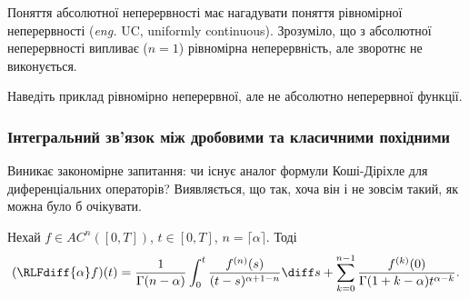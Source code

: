 \begin{remark}
    Поняття абсолютної неперервності має нагадувати поняття рівномірної неперервності (\textit{eng.} UC, uniformly continuous). Зрозуміло, що з абсолютної неперервності випливає ($n = 1$) рівномірна неперервність, але зворотнє не виконується.
\end{remark}

\begin{exercise}
    Наведіть приклад рівномірно неперервної, але не абсолютно неперервної функції.
\end{exercise}



\subsubsection{Інтегральний зв'язок між дробовими та класичними похідними}

Виникає закономірне запитання: чи існує аналог формули Коші-Діріхле для диференціальних операторів? Виявляється, що так, хоча він і не зовсім такий, як можна було б очікувати.

\begin{theorem}
    Нехай $f \in AC^n([0, T])$, $t \in [0, T]$, $n = \lceil \alpha \rceil$. Тоді
    \begin{equation}
        (\RLFdiff{\alpha} f) (t) = \frac{1}{\Gamma(n - \alpha)} \int_0^t \frac{f^{(n)}(s)}{(t - s)^{\alpha + 1 - n}} \diff s + \sum_{k = 0}^{n - 1} \frac{f^{(k)}(0)}{\Gamma(1 + k - \alpha) t^{\alpha - k}}.
    \end{equation}
\end{theorem}

